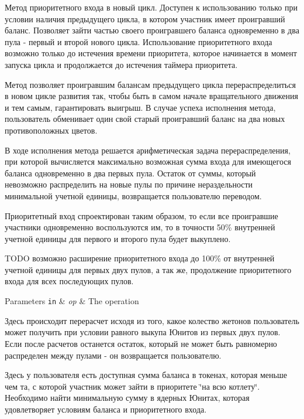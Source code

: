 Метод приоритетного входа в новый цикл. Доступен к использованию только при условии наличия предыдущего цикла, в котором участник имеет проигравший баланс. Позволяет зайти частью своего проигравшего баланса одновременно в два пула -\/ первый и второй нового цикла. Использование приоритетного входа возможно только до истечения времени приоритета, которое начинается в момент запуска цикла и продолжается до истечения таймера приоритета. 

Метод позволяет проигравшим балансам предыдущего цикла перераспределиться в новом цикле развития так, чтобы быть в самом начале вращательного движения и тем самым, гарантировать выигрыш. В случае успеха исполнения метода, пользователь обменивает один свой старый проигравший баланс на два новых противоположных цветов.

В ходе исполнения метода решается арифметическая задача перераспределения, при которой вычисляется максимально возможная сумма входа для имеющегося баланса одновременно в два первых пула. Остаток от суммы, который невозможно распределить на новые пулы по причине нераздельности минимальной учетной единицы, возвращается пользователю переводом.

Приоритетный вход спроектирован таким образом, то если все проигравшие участники одновременно воспользуются им, то в точности 50\% внутренней учетной единицы для первого и второго пула будет выкуплено.

T\+O\+DO возможно расширение приоритетного входа до 100\% от внутренней учетной единицы для первых двух пулов, а так же, продолжение приоритетного входа для всех последующих пулов.


\begin{DoxyParams}[1]{Parameters}
\mbox{\tt in}  & {\em op} & The operation \\
\hline
\end{DoxyParams}
Здесь происходит перерасчет исходя из того, какое колество жетонов пользователь может получить при условии равного выкупа Юнитов из первых двух пулов. Если после расчетов останется остаток, который не может быть равномерно распределен между пулами -\/ он возвращается пользователю.

Здесь у пользователя есть доступная сумма баланса в токенах, которая меньше чем та, с которой участник может зайти в приоритете \char`\"{}на всю котлету\char`\"{}. Необходимо найти минимальную сумму в ядерных Юнитах, которая удовлетворяет условиям баланса и приоритетного входа.\mbox{\label{classeosio_1_1unicore_a109b4a1d03b051e6d42a746d245ece71}} 
